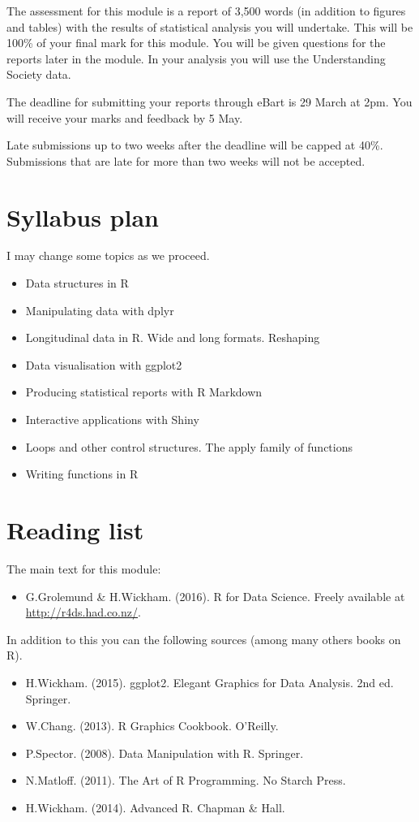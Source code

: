 \documentclass[indentfirst]{article}
\begin{document}
The assessment for this module is a report of 3,500 words (in addition to figures and tables) with the results of statistical analysis you will undertake. This will be 100\% of your final mark for this module. You will be given questions for the reports later in the module. In your analysis you will use the Understanding Society data.

The deadline for submitting your reports through eBart is 29 March at 2pm. You will receive your marks and feedback by 5 May.

Late submissions up to two weeks after the deadline will be capped at 40\%. Submissions that are late for more than two weeks will not be accepted.


\section{Syllabus plan}

I may change some topics as we proceed.

\begin{itemize}

\item Data structures in R
\item Manipulating data with dplyr
\item Longitudinal data in R. Wide and long formats. Reshaping
\item Data visualisation with ggplot2
\item Producing statistical reports with R Markdown
\item Interactive applications with Shiny
\item Loops and other control structures. The apply family of functions
\item Writing functions in R

\end{itemize}


\section{Reading list}

The main text for this module:

\begin{itemize}
\item G.Grolemund \& H.Wickham. (2016). R for Data Science. Freely available at \url{http://r4ds.had.co.nz/}.
\end{itemize}

In addition to this you can the following sources (among many others books on R).

\begin{itemize}
\item H.Wickham. (2015). ggplot2. Elegant Graphics for Data Analysis. 2nd ed. Springer.
\item W.Chang. (2013). R Graphics Cookbook. O'Reilly.
\item P.Spector. (2008). Data Manipulation with R. Springer.
\item N.Matloff. (2011). The Art of R Programming. No Starch Press.
\item H.Wickham. (2014). Advanced R. Chapman \& Hall.
\end{itemize}
\end{document}
